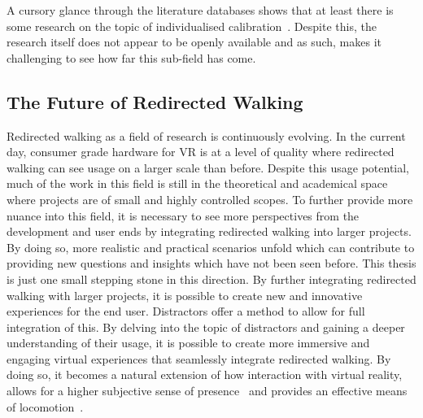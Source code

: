 A cursory glance through the literature databases shows that at least there is some research on the topic of individualised calibration~\cite{hutton2018individualized}. Despite this, the research itself does not appear to be openly available and as such, makes it challenging to see how far this sub-field has come. 

\subsection{The Future of Redirected Walking}
Redirected walking as a field of research is continuously evolving. In the current day, consumer grade hardware for VR is at a level of quality where redirected walking can see usage on a larger scale than before. Despite this usage potential, much of the work in this field is still in the theoretical and academical space where projects are of small and highly controlled scopes. To further provide more nuance into this field, it is necessary to see more perspectives from the development and user ends by integrating redirected walking into larger projects. By doing so, more realistic and practical scenarios unfold which can contribute to providing new questions and insights which have not been seen before. This thesis is just one small stepping stone in this direction. By further integrating redirected walking with larger projects, it is possible to create new and innovative experiences for the end user. Distractors offer a method to allow for full integration of this. By delving into the topic of distractors and gaining a deeper understanding of their usage, it is possible to create more immersive and engaging virtual experiences that seamlessly integrate redirected walking. By doing so, it becomes a natural extension of how interaction with virtual reality, allows for a higher subjective sense of presence~\cite{peck2009evaluation, peck2011evaluation} and provides an effective means of locomotion~\cite{razzaque2001redirected, peck2011evaluation}.

\iffalse
   * Having people's first experience with VR be with redirected walking
      * They might normalise the redirected walking elements
         * \todo{Will have to look deeper into the data on people with no experience and how many detections they did}

\subsection{Distractor Salience and Optical Flow}
* How does salience impact optical flow? How does this then impact the noticeability of redirection?
* Already covered by other sections I'd say
\fi